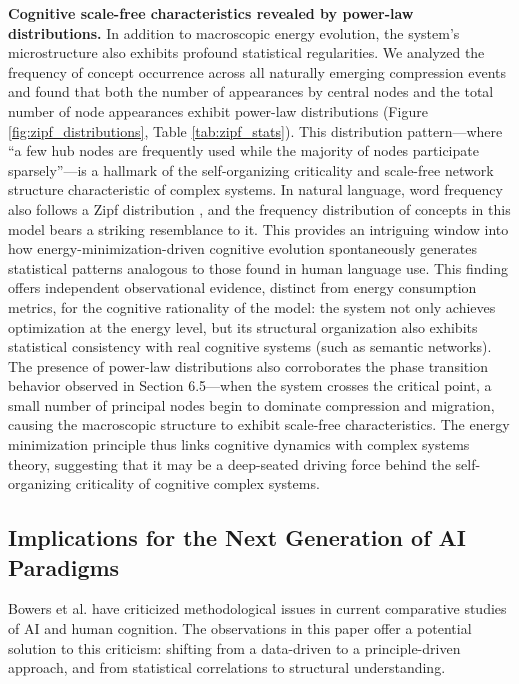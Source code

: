 \documentclass[10pt,onecolumn]{article}
\begin{document}
\textbf{Cognitive scale-free characteristics revealed by power-law distributions.} In addition to macroscopic energy evolution, the system’s microstructure also exhibits profound statistical regularities. We analyzed the frequency of concept occurrence across all naturally emerging compression events and found that both the number of appearances by central nodes and the total number of node appearances exhibit power-law distributions (Figure \ref{fig:zipf_distributions}, Table \ref{tab:zipf_stats}). This distribution pattern—where “a few hub nodes are frequently used while the majority of nodes participate sparsely”—is a hallmark of the self-organizing criticality and scale-free network structure characteristic of complex systems. In natural language, word frequency also follows a Zipf distribution \citep{zipf1949human}, and the frequency distribution of concepts in this model bears a striking resemblance to it. This provides an intriguing window into how energy-minimization-driven cognitive evolution spontaneously generates statistical patterns analogous to those found in human language use. This finding offers independent observational evidence, distinct from energy consumption metrics, for the cognitive rationality of the model: the system not only achieves optimization at the energy level, but its structural organization also exhibits statistical consistency with real cognitive systems (such as semantic networks). The presence of power-law distributions also corroborates the phase transition behavior observed in Section 6.5—when the system crosses the critical point, a small number of principal nodes begin to dominate compression and migration, causing the macroscopic structure to exhibit scale-free characteristics. The energy minimization principle thus links cognitive dynamics with complex systems theory, suggesting that it may be a deep-seated driving force behind the self-organizing criticality of cognitive complex systems.

\subsection{Implications for the Next Generation of AI Paradigms}

Bowers et al. have criticized methodological issues in current comparative studies of AI and human cognition. The observations in this paper offer a potential solution to this criticism: shifting from a data-driven to a principle-driven approach, and from statistical correlations to structural understanding.
\end{document}
